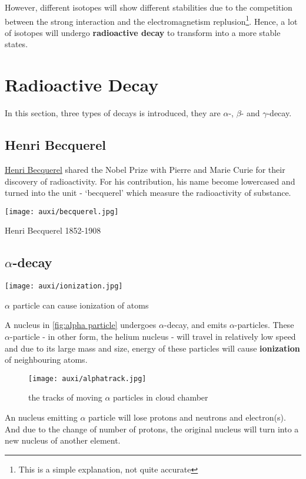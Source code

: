 \documentclass[a4paper]{tufte-handout}
\newenvironment{TaskBox} %
{\begin{tcolorbox}[breakable,colback=b1!30,colframe=b1,title=Task]} {\end{tcolorbox}}
\begin{document}
However, different isotopes will show different stabilities due to the competition between the strong interaction and the electromagnetism replusion\footnote{This is a simple explanation, not quite accurate}. Hence, a lot of isotopes will undergo \textbf{radioactive decay} to transform into a more stable states.

\section{Radioactive Decay}
In this section, three types of decays is introduced, they are $\alpha$-, $\beta$- and $\gamma$-decay. 

\subsection{Henri Becquerel}
\href{https://www.britannica.com/biography/Henri-Becquerel}{Henri Becquerel} shared the Nobel Prize with Pierre and Marie Curie for their discovery of radioactivity. For his contribution, his name become lowercased and turned into the unit - `becquerel' which measure the radioactivity of substance. 
\begin{marginfigure}
\centering
\texttt{[image: auxi/becquerel.jpg]}
\caption{Henri Becquerel 1852-1908}
\end{marginfigure}

\subsection{$\alpha$-decay}
\begin{marginfigure}
\texttt{[image: auxi/ionization.jpg]}
\caption{$\alpha$ particle can cause ionization of atoms}
\end{marginfigure}

A nucleus in \ref{fig:alpha particle} undergoes $\alpha$-decay, and emits $\alpha$-particles. These $\alpha$-particle - in other form, the helium nucleus - will travel in relatively low speed and due to its large mass and size, energy of these particles will cause \textbf{ionization} of neighbouring atoms.
\begin{figure}[h]
\centering
\texttt{[image: auxi/alphatrack.jpg]}
\caption{the tracks of moving $\alpha$ particles in cloud chamber}
\end{figure}

\begin{TaskBox}
An nucleus emitting $\alpha$ particle will lose \uline{\hspace{4em}} protons and \uline{\hspace{4em}} neutrons and \uline{\hspace{4em}} electron(s). And due to the change of number of protons, the original nucleus will turn into a new nucleus of another element.
\end{TaskBox}
\end{document}
